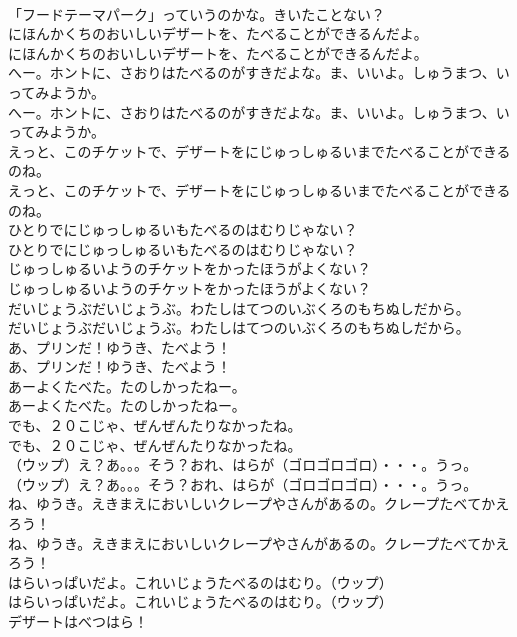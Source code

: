 \documentclass[8pt]{extreport}
\begin{document}
\begin{CJK}{UTF8}{min}
\\	「フードテーマパーク」っていうのかな。きいたことない？
\\	にほんかくちのおいしいデザートを、たべることができるんだよ。
\\	にほんかくちのおいしいデザートを、たべることができるんだよ。
\\	へー。ホントに、さおりはたべるのがすきだよな。ま、いいよ。しゅうまつ、いってみようか。
\\	へー。ホントに、さおりはたべるのがすきだよな。ま、いいよ。しゅうまつ、いってみようか。
\\	えっと、このチケットで、デザートをにじゅっしゅるいまでたべることができるのね。
\\	えっと、このチケットで、デザートをにじゅっしゅるいまでたべることができるのね。
\\	ひとりでにじゅっしゅるいもたべるのはむりじゃない？
\\	ひとりでにじゅっしゅるいもたべるのはむりじゃない？
\\	じゅっしゅるいようのチケットをかったほうがよくない？
\\	じゅっしゅるいようのチケットをかったほうがよくない？
\\	だいじょうぶだいじょうぶ。わたしはてつのいぶくろのもちぬしだから。
\\	だいじょうぶだいじょうぶ。わたしはてつのいぶくろのもちぬしだから。
\\	あ、プリンだ！ゆうき、たべよう！
\\	あ、プリンだ！ゆうき、たべよう！
\\	あーよくたべた。たのしかったねー。
\\	あーよくたべた。たのしかったねー。
\\	でも、２０こじゃ、ぜんぜんたりなかったね。
\\	でも、２０こじゃ、ぜんぜんたりなかったね。
\\	（ウップ）え？あ。。。そう？おれ、はらが（ゴロゴロゴロ）・・・。うっ。
\\	（ウップ）え？あ。。。そう？おれ、はらが（ゴロゴロゴロ）・・・。うっ。
\\	ね、ゆうき。えきまえにおいしいクレープやさんがあるの。クレープたベてかえろう！
\\	ね、ゆうき。えきまえにおいしいクレープやさんがあるの。クレープたベてかえろう！
\\	はらいっぱいだよ。これいじょうたべるのはむり。（ウップ）
\\	はらいっぱいだよ。これいじょうたべるのはむり。（ウップ）
\\	デザートはべつはら！

\end{CJK}
\end{document}
